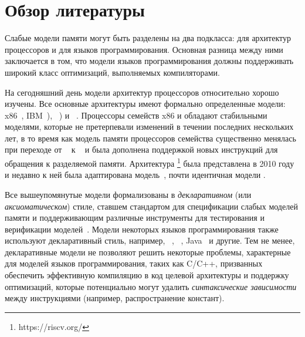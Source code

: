 \section{Обзор литературы}
\label{sec:related}

Слабые модели памяти могут быть разделены на два подкласса:
для архитектур процессоров и  для языков программирования.
Основная разница между ними заключается в том, что  модели языков программирования
должны поддерживать широкий класс оптимизаций, выполняемых компиляторами. 

На сегодняшний день модели архитектур процессоров относительно хорошо изучены. 
Все основные архитектуры имеют формально определенные модели:
x86~\cite{Sewell-al:CACM10}, IBM~\POWER \cite{Alglave-DAMP09,Sarkar-al:PLDI11,Alglave-al:TOPLAS14}),
\ARM~\cite{Chong-ASPLOS08, Alglave-DAMP09,Pulte-al:POPL18,Flur-al:POPL16,Alglave-al:TOPLAS14})
и \RISC~\cite{Pulte-al:POPL18}.
Процессоры семейств x86 и \POWER обладают стабильными моделями, 
которые не претерпевали изменений в течении последних нескольких лет, 
в то время как модель памяти процессоров семейства \ARM 
существенно менялась при переходе от ~\cite{Alglave-al:TOPLAS14} 
к ~\cite{Pulte-al:POPL18}
и была дополнена поддержкой новых инструкций для обращения к разделяемой памяти.
Архитектура \RISC\footnote{https://riscv.org/} была представлена в 2010 году 
и недавно к ней была адаптирована модель~\cite{Pulte-al:POPL18}, 
почти идентичная модели .

Все вышеупомянутые модели формализованы в \emph{декларативном} 
(или \emph{аксиоматическом}) стиле, 
ставшем стандартом для спецификации слабых моделей памяти и 
поддерживающим различные инструменты для 
тестирования и верификации моделей~\cite{Alglave-al:TOPLAS14}.
Модели некоторых языков программирования также используют декларативный стиль, например,
\CPP~\cite{Batty-al:POPL11}, \JS~\cite{Watt-al:PLDI2020}, Java~\cite{Manson-al:POPL05} и другие.
Тем не менее, декларативные модели не позволяют решить некоторые проблемы, 
характерные для моделей языков программирования, таких как C/C++, 
призванных обеспечить эффективную компиляцию в код целевой архитектуры и 
поддержку оптимизаций, которые потенциально могут удалить 
\emph{синтаксические зависимости} между инструкциями 
(например, распространение констант). 

